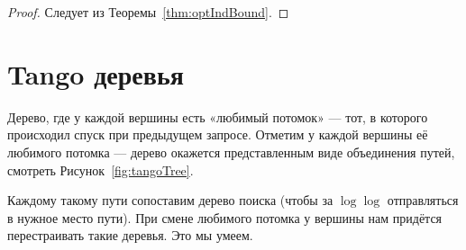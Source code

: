 \begin{proof}
Следует из Теоремы~\ref{thm:optIndBound}.
\end{proof}



\section{Tango деревья}

Дерево, где у каждой вершины есть «любимый потомок» — тот, в которого происходил спуск при предыдущем запросе. Отметим у каждой вершины её любимого потомка — дерево окажется представленным виде объединения путей, смотреть Рисунок~\ref{fig:tangoTree}.



Каждому такому пути сопоставим дерево поиска (чтобы за $\log \log$ отправляться в нужное место пути). При смене любимого потомка у вершины нам придётся перестраивать такие деревья. Это мы умеем.